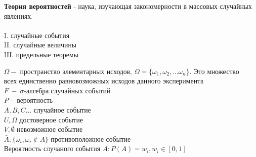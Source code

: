 


    \textbf{Теория вероятностей}  - наука, изучающая закономерности в массовых случайных явлениях.\\
    \\
    I. случайные события\\
    II. случайные величины\\
    III. предельные теоремы

   
    \(\Omega - \) пространство элементарных исходов, \(\Omega = \{\omega_1, \omega_2, ... \omega_n\}\). 
        Это множество всех единственно равновозможных исходов данного эксперимента\\
    \(F \ - \ \sigma\)-алгебра случайных событий\\
    \(P - \)вероятность\\

    \(A, B, C...\) случайное событие\\
    \(U, \Omega\) достоверное событие\\
    \(V, \emptyset\) невозможное событие\\ 
    \(\bar A, \{\omega_i, \omega_i \notin A\}\) противоположное событие\\

    Вероятность случаного события \(A : P(A) = w_i, w_i\in[0,1]\)
    
